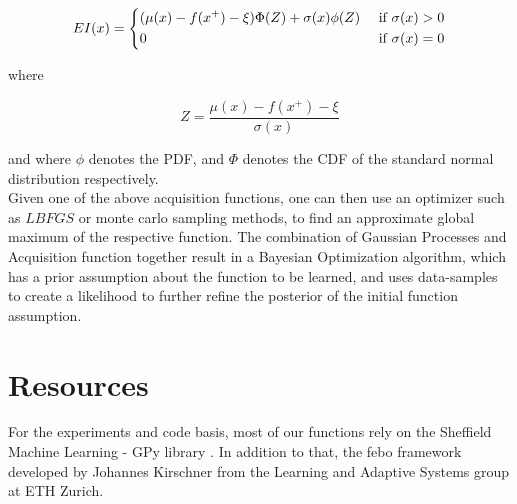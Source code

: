 \begin{align}
    EI(x) =
    \begin{dcases}
        ( \mu (x) - f(x^+) - \xi) \Phi(Z) + \sigma (x) \phi (Z) & \text{ if } \sigma (x) > 0 \\
        0 & \text{ if } \sigma (x) = 0
    \end{dcases} \\
\end{align}

where

\begin{equation}
    Z = \frac{\mu (x) - f(x^+) - \xi}{\sigma(x)}
\end{equation}

and where $\phi$ denotes the PDF, and $\Phi$ denotes the CDF of the standard normal distribution respectively. \\

Given one of the above acquisition functions, one can then use an optimizer such as $LBFGS$ or monte carlo sampling methods, to find an approximate global maximum of the respective function.
The combination of Gaussian Processes and Acquisition function together result in a Bayesian Optimization algorithm, which has a prior assumption about the function to be learned, and uses data-samples to create a likelihood to further refine the posterior of the initial function assumption.

\section{Resources}
For the experiments and code basis, most of our functions rely on the Sheffield Machine Learning - GPy library \citep{gpy2014}.
In addition to that, the febo framework developed by Johannes Kirschner from the Learning and Adaptive Systems group at ETH Zurich.